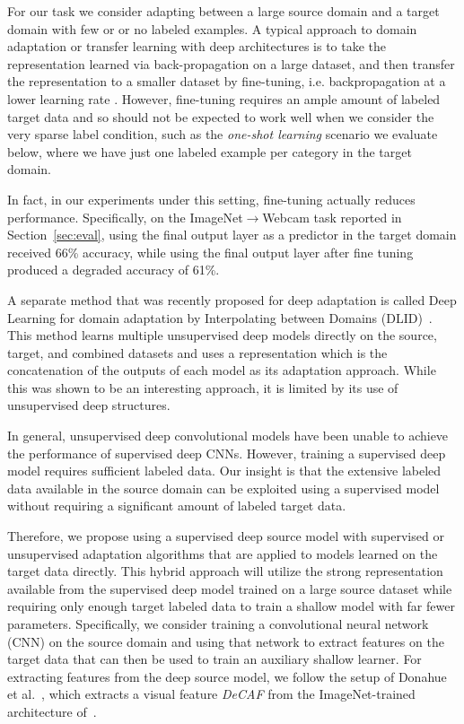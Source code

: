\label{sec:decaf}
For our task we consider adapting between a large source domain and a target domain with few or or no labeled examples. 
A typical approach to domain adaptation or transfer learning with deep architectures is to take the representation learned via back-propagation on a large dataset, and then transfer the representation to a smaller dataset by fine-tuning, i.e. backpropagation at a lower learning rate \cite{rcnn,zeiler-arxiv-2013}.
However, fine-tuning requires an ample amount of labeled target data and so should not be expected to work well when we consider the very sparse label condition, such as the \textit{one-shot learning} scenario we evaluate below, where we have just one labeled example per category in the target domain.

In fact, in our experiments under this setting, fine-tuning actually reduces performance.
Specifically, on the ImageNet$\rightarrow$Webcam task reported in Section~\ref{sec:eval}, using the final output layer as a predictor in the target domain received 66\% accuracy, while using the final output layer after fine tuning produced a degraded accuracy of 61\%.

A separate method that was recently proposed for deep adaptation is called Deep Learning for domain adaptation by Interpolating between Domains (DLID)~\cite{ref:dlid}. This method learns multiple unsupervised deep models directly on the source, target, and combined datasets and uses a representation which is the concatenation of the outputs of each model as its adaptation approach. 
While this was shown to be an interesting approach, it is limited by its use of unsupervised deep structures. 

In general, unsupervised deep convolutional models have been unable to achieve the performance of supervised deep CNNs. However, training a supervised deep model requires sufficient labeled data. Our insight is that the extensive labeled data available in the source domain can be exploited using a supervised model without requiring a significant amount of labeled target data.

Therefore, we propose using a supervised deep source model with supervised or unsupervised adaptation algorithms that are applied to models learned on the target data directly. 
This hybrid approach will utilize the strong representation available from the supervised deep model trained on a large source dataset while requiring only enough target labeled data to train a shallow model with far fewer parameters. 
Specifically, we consider training a convolutional neural network (CNN) on the source domain and using that network to extract features on the target data that can then be used to train an auxiliary shallow learner. 
For extracting features from the deep source model, we follow the setup of Donahue et al.~\cite{deeplearning-arxiv-2013}, which extracts a visual feature \textit{DeCAF} from the ImageNet-trained architecture of~\cite{supervision}.

